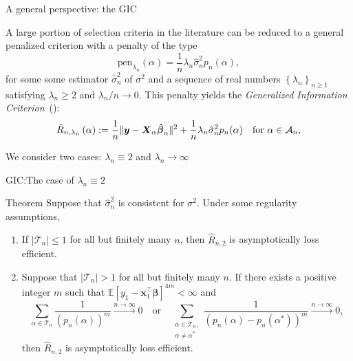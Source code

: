 \documentclass{beamer}
\newcommand{\0}{\emptyset}
\newcommand{\Ep}[1]{\mathbb{E}\left[ #1 \right]}
\newcommand{\paren}[1]{\left(#1 \right)}
\newcommand{\set}[1]{\left\{ #1 \right\}}
\newcommand{\norm}[1]{|\hspace{-1pt}|#1 |\hspace{-1pt}|}
\newcommand{\normsq}[1]{\norm{#1}^{2}}
\newcommand{\Acal}{\mathcal{A}_{n}}
\newcommand{\Tcal}{\mathcal{T}_{n}}
\newcommand{\X}{\boldsymbol{X}}
\newcommand{\x}{\boldsymbol{x}}
\newcommand{\y}{\boldsymbol{y}}
\newcommand{\bbeta}{\boldsymbol{\beta}}
\newcommand{\bbetahat}{\boldsymbol{\hat{\beta}}}
\newcommand{\Rhat}[2]{\hat{R}_{n, #1}\paren{#2}}
\newcommand{\sigmahat}{\hat{\sigma}^{2}_{n}}
\newcommand{\1}{\mathmybb{1}}
\begin{document}
\begin{frame}{A general perspective: the GIC}
  
    A large portion of selection criteria in the literature can be reduced to a general penalized criterion with a penalty of the type 
    \[\mathrm{pen}_{\lambda_{n}}(\alpha) = \frac{1}{n} \lambda_{n} \sigmahat p_{n}(\alpha),\]
    for some some estimator \(\sigmahat\) of \(\sigma^{2}\) and a sequence of real numbers \(\set{\lambda_{n}}_{n\geq 1}\) satisfying \(\lambda_{n}\geq 2\) and \(\lambda_{n}/n\to 0\). This penalty yields the \alert{\emph{Generalized Information Criterion}}~(\cite{shao_1997}):
    \[\Rhat{\lambda_{n}}{\alpha} := \frac{1}{n}\normsq{\y - \X_{\alpha}\bbetahat_{\alpha}} + \frac{1}{n}\lambda_{n}\sigmahat p_{n}(\alpha)\quad\text{for }\alpha\in\Acal,\]

    We consider two cases: \(\lambda_{n}\equiv 2\) and \(\lambda_{n}\to\infty\)
\end{frame}

\begin{frame}{GIC:\@ The case of \(\lambda_{n} \equiv 2\)}
  
\begin{block}{Theorem}
    Suppose that \(\sigmahat\) is consistent for \(\sigma^{2}\). Under some regularity assumptions, 
    \begin{enumerate}
        \item If \(|\Tcal|\leq1\) for all but finitely many \(n\), then \(\hat{R}_{n,2}\) is asymptotically loss efficient.
        \item Suppose that \(|\Tcal|> 1\) for all but finitely many \(n\). If there exists a positive integer \(m\) such that \(\Ep{y_{1} - \x_{1}^{\top}\bbeta}^{4m}<\infty\) and 
        \begin{equation}\label{eq:conditionsums}
            \sum_{\alpha\in\Tcal}\frac{1}{\paren{p_{n}(\alpha)}^{m}}\xrightarrow{n\to\infty} 0 \quad\text{or}\quad \sum_{\substack{\alpha\in\Tcal,\\ \alpha\neq\alpha^{*}}}\frac{1}{\paren{p_{n}(\alpha) - p_{n}(\alpha^{*})}^{m}}\xrightarrow{n\to\infty} 0,
        \end{equation}
        then \(\hat{R}_{n,2}\) is asymptotically loss efficient.
    \end{enumerate}
\end{block}
\end{frame}
\end{document}
